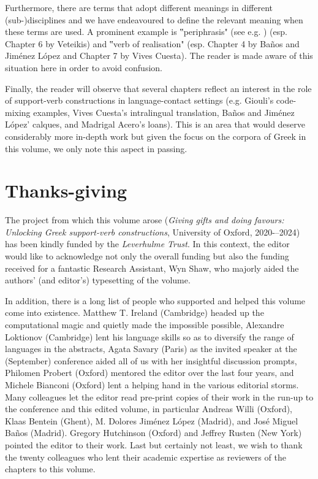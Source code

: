 \documentclass[output=paper,colorlinks,citecolor=brown]{langscibook}
\begin{document}
Furthermore, there are terms that adopt different meanings in different (sub\nobreakdash-)disciplines and we have endeavoured to define the relevant meaning when these terms are used. A prominent example is ‟periphrasis" (see e.g. \citealt{ledgewayPeriphrasisInflexionDiachrony2022, haspelmathPeriphrasis2000, aertsPeriphrasticaInvestigationUse1965}) (esp. Chapter 6 by Veteikis) and ‟verb of realisation" \citep{melcukVerbesSupportsSans2004, melcukGeneralPhraseology2023} (esp. Chapter 4 by Baños and Jiménez López and Chapter 7 by Vives Cuesta). The reader is made aware of this situation here in order to avoid confusion. 


Finally, the reader will observe that several chapters reflect an interest in the role of support-verb constructions in language-contact settings (e.g. Giouli’s code-mixing examples, Vives Cuesta’s intralingual translation, Baños and Jiménez López’ calques, and Madrigal Acero’s loans). This is an area that would deserve considerably more in-depth work but given the focus on the corpora of Greek in this volume, we only note this aspect in passing. 


\section{Thanks-giving}
The project from which this volume arose (\textit{Giving gifts and doing favours: Unlocking Greek support-verb constructions}, University of Oxford, 2020-–2024) has been kindly funded by the \textit{Leverhulme Trust}. In this context, the editor would like to acknowledge not only the overall funding but also the funding received for a fantastic Research Assistant, Wyn Shaw, who majorly aided the authors’ (and editor’s) typesetting of the volume.


In addition, there is a long list of people who supported and helped this volume come into existence. Matthew T. Ireland (Cambridge) headed up the computational magic and quietly made the impossible possible, Alexandre Loktionov (Cambridge) lent his language skills so as to diversify the range of languages in the abstracts, Agata Savary (Paris) as the invited speaker at the (September) conference aided all of us with her insightful discussion prompts, Philomen Probert (Oxford) mentored the editor over the last four years, and Michele Bianconi (Oxford) lent a helping hand in the various editorial storms. Many colleagues let the editor read pre-print copies of their work in the run-up to the conference and this edited volume, in particular Andreas Willi (Oxford), Klaas Bentein (Ghent), M. Dolores Jiménez López (Madrid), and José Miguel Baños (Madrid). Gregory Hutchinson (Oxford) \citep{hutchinsonRepetitionRangeAttention2017} and Jeffrey Rusten (New York) \citep{rustenTenEkvolenTou2020} pointed the editor to their work. Last but certainly not least, we wish to thank the twenty colleagues who lent their academic expertise as reviewers of the chapters to this volume.
\end{document}
